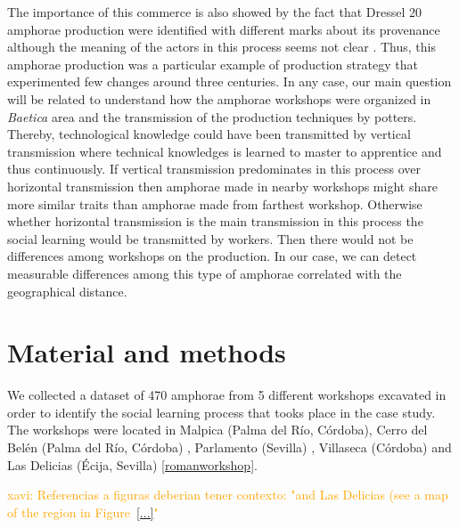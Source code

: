 \documentclass[review]{elsarticle}
\newcommand{\memo}[2]{\textcolor{#1}{#2}}
\newcommand{\xavi}[1]{\memo{orange}{xavi: #1\\}}
\begin{document}
The importance of this commerce is also showed by the fact that Dressel 20 amphorae production were identified with different marks about its provenance although the meaning of the actors in this process seems not clear \citep{coto-sarmiento_maria_bayesian_????}. Thus, this amphorae production was a particular example of production strategy that experimented few changes around three centuries. In any case, our main question will be related to understand how the amphorae workshops were organized in \textit{Baetica} area and the transmission of the production techniques by potters. Thereby, technological knowledge could have been transmitted by vertical transmission where technical knowledges is learned to master to apprentice and thus continuously. If vertical transmission predominates in this process over horizontal transmission then amphorae made in nearby workshops might share more similar traits than amphorae made from farthest workshop. Otherwise whether horizontal transmission is the main transmission in this process the social learning would be transmitted by workers. Then there would not be differences among workshops on the production. In our case, we can detect measurable differences among this type of amphorae correlated with the geographical distance.


\section{Material and methods}

We collected a dataset of 470 amphorae from 5 different workshops excavated in order to identify the social learning process that tooks place in the case study. The workshops were located in Malpica (Palma del R\'io, C\'ordoba), Cerro del Bel\'en (Palma del R\'io, C\'ordoba) \citep{diaz_trujillo_excavacion_1992}, Parlamento (Sevilla) \citep{garcia_vargas_anforas_2000}, Villaseca (C\'ordoba)\citep{garcia_vargas_enrique_excavacion_????} and Las Delicias (\'Ecija, Sevilla) \citep{fernandez_excavacion_2001,_atelier_2014} \ref{romanworkshop}.


\xavi{Referencias a figuras deberian tener contexto: "and Las Delicias (see a map of the region in Figure~\ref{...}"}
\end{document}
